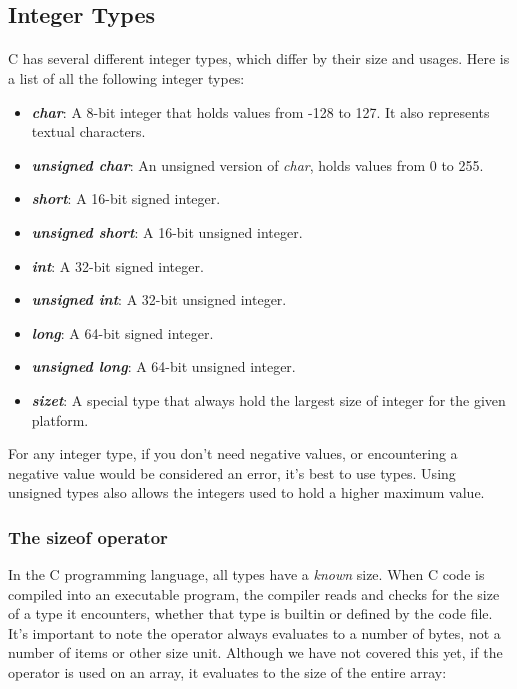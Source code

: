 \subsection{Integer Types}

\paragraph{  } C has several different integer types, which differ by their size and usages. Here is a list of all the following integer types: \\

\begin{itemize}
\item \emph{\textbf{char}}: A 8-bit integer that holds values from -128 to 127. It also represents textual characters.
\item \emph{\textbf{unsigned char}}: An unsigned version of \emph{char}, holds values from 0 to 255.
\item \emph{\textbf{short}}: A 16-bit signed integer.
\item \emph{\textbf{unsigned short}}: A 16-bit unsigned integer.
\item \emph{\textbf{int}}: A 32-bit signed integer.
\item \emph{\textbf{unsigned int}}: A 32-bit unsigned integer.
\item \emph{\textbf{long}}: A 64-bit signed integer.
\item \emph{\textbf{unsigned long}}: A 64-bit unsigned integer.
\item \emph{\textbf{size\textunderscore t}}: A special type that always hold the largest size of integer for the given platform.
\end{itemize}

\par For any integer type, if you don't need negative values, or encountering a negative value would be considered an error, it's best to use  types. Using unsigned types also allows the integers used to hold a higher maximum value.

\subsubsection{The sizeof operator}

In the C programming language, all types have a \emph{known} size.  When C code is compiled into an executable program, the compiler reads and checks for the size of a type it encounters, whether that type is builtin or defined by the code file. It's important to note the  operator always evaluates to a number of bytes, not a number of items or other size unit. Although we have not covered this yet, if the operator is used on an array, it evaluates to the size of the entire array:

